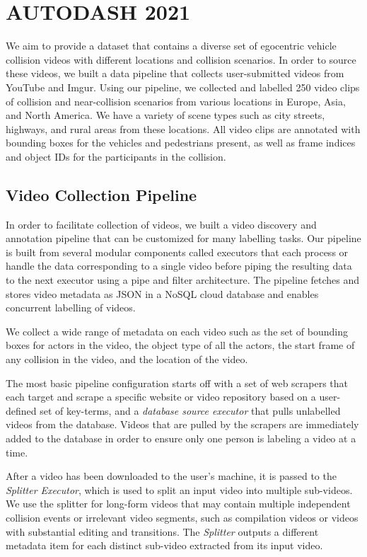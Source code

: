 \documentclass[letterpaper, 10 pt, conference]{ieeeconf}
\begin{document}
\section{AUTODASH 2021}
We aim to provide a dataset that contains a diverse set of egocentric vehicle collision videos with different locations and collision scenarios. In order to source these videos, we built a data pipeline that collects user-submitted videos from YouTube and Imgur. Using our pipeline, we collected and labelled 250 video clips of collision and near-collision scenarios from various locations in Europe, Asia, and North America. We have a variety of scene types such as city streets, highways, and rural areas from these locations. All video clips are annotated with bounding boxes for the vehicles and pedestrians present, as well as frame indices and object IDs for the participants in the collision.

\subsection{Video Collection Pipeline}
In order to facilitate collection of videos, we built a video discovery and annotation pipeline that can be customized for many labelling tasks. Our pipeline is built from several modular components called executors that each process or handle the data corresponding to a single video before piping the resulting data to the next executor using a pipe and filter architecture. The pipeline fetches and stores video metadata as JSON in a NoSQL cloud database and enables concurrent labelling of videos.

We collect a wide range of metadata on each video such as the set of bounding boxes for actors in the video, the object type of all the actors, the start frame of any collision in the video, and the location of the video.

The most basic pipeline configuration starts off with a set of web scrapers that each target and scrape a specific website or video repository based on a user-defined set of key-terms, and a \textit{database source executor} that pulls unlabelled videos from the  database. Videos that are pulled by the scrapers are immediately added to the database in order to ensure only one person is labeling a video at a time.

After a video has been downloaded to the user's machine, it is passed to the \textit{Splitter Executor}, which is used to split an input video into multiple sub-videos. We use the splitter for long-form videos that may contain multiple independent collision events or irrelevant video segments, such as compilation videos or videos with substantial editing and transitions. The \textit{Splitter} outputs a different metadata item for each distinct sub-video extracted from its input video.
\end{document}
